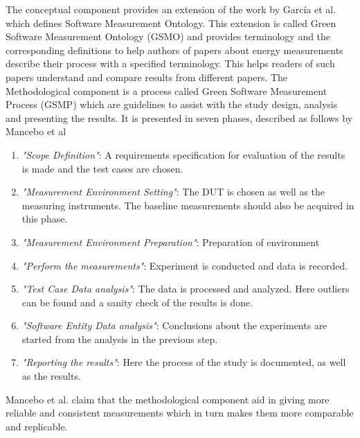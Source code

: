 The conceptual component provides an extension of the work by García et al.\cite{GarciaSMO} which defines Software Measurement Ontology. This extension is called Green Software Measurement Ontology (GSMO) and provides terminology and the corresponding definitions to help authors of papers about energy measurements describe their process with a specified terminology. This helps readers of such papers understand and compare results from different papers. The Methodological component is a process called Green Software Measurement Process (GSMP) which are guidelines to assist with the study design, analysis and presenting the results. It is presented in seven phases, described as follows by Mancebo et al\cite*{GarciaFEETINGS}
\begin{enumerate}
    \item \textit{"Scope Definition"}: A requirements specification for evaluation of the results is made and the test cases are chosen.
    \item \textit{"Measurement Environment Setting"}: The DUT is chosen as well as the measuring instruments. The baseline measurements should also be acquired in this phase.
    \item \textit{"Measurement Environment Preparation"}: Preparation of environment
    \item \textit{"Perform the measurements"}: Experiment is conducted and data is recorded. 
    \item \textit{"Test Case Data analysis"}: The data is processed and analyzed. Here outliers can be found and a sanity check of the results is done.
    \item \textit{"Software Entity Data analysis"}: Conclusions about the experiments are started from the analysis in the previous step.
    \item \textit{"Reporting the results"}: Here the process of the study is documented, as well as the results. 
\end{enumerate} 

Mancebo et al.\cite*{GarciaFEETINGS} claim that the methodological component aid in giving more reliable and consistent measurements which in turn makes them more comparable and replicable. 

